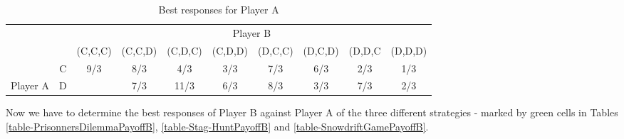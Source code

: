 \documentclass[a4paper, 11pt]{article}
\begin{document}
\begin{table}[!htb]
\centering
\caption{Best responses for Player A}
\label{table-expectedPayoffForA-SelectedCells}
\begin{tabular}{lc|c|c|c|c|c|c|c|c|}
\cline{3-10}
                                                 & \multicolumn{1}{c|}{} & \multicolumn{8}{c|}{Player B}                                                                                                                                                                                                                                          \\ \cline{3-10} 
                                                 &                       & (C,C,C)                                             & (C,C,D)                     & (C,D,C)                      & (C,D,D)                     & (D,C,C)                     & (D,C,D)                     & (D,D,C                      & (D,D,D)                     \\ \hline
\multicolumn{1}{|l|}{}                           & C                     & 9/3                                                 & \cellcolor[HTML]{FE0000}8/3 & 4/3                          & 3/3                         & 7/3                         & \cellcolor[HTML]{FE0000}6/3 & 2/3                         & 1/3                         \\ \cline{2-10} 
\multicolumn{1}{|l|}{\multirow{-2}{*}{Player A}} & D                     & \cellcolor[HTML]{FE0000}{\color[HTML]{000000} 12/3} & 7/3                         & \cellcolor[HTML]{FE0000}11/3 & \cellcolor[HTML]{FE0000}6/3 & \cellcolor[HTML]{FE0000}8/3 & 3/3                         & \cellcolor[HTML]{FE0000}7/3 & \cellcolor[HTML]{FE0000}2/3 \\ \hline
\end{tabular}
\end{table}


Now we have to determine the best responses of Player B against Player A of the three different strategies - marked by green cells in Tables \ref{table-PrisonnersDilemmaPayoffB}, \ref{table-Stag-HuntPayoffB} and \ref{table-SnowdriftGamePayoffB}.
\end{document}
